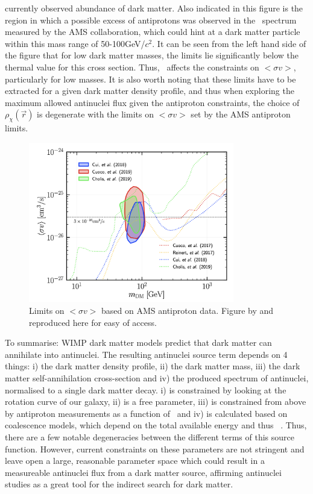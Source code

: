 currently observed abundance of dark matter. Also indicated in this figure is the region in which a possible excess of antiprotons was observed in the \pbar\ spectrum measured by the AMS collaboration, which could hint at a dark matter particle within this mass range of 50-100GeV/$c^2$. It can be seen from the left hand side of the figure that for low dark matter masses, the limits lie significantly below the thermal value for this cross section. Thus, \dmm\ affects the constraints on  $<\sigma v>$, particularly for low masses. It is also worth noting that these limits have to be extracted for a given dark matter density profile, and thus when exploring the maximum allowed antinuclei flux given the antiproton constraints, the choice of $\rho_\chi(\vec{r})$ is degenerate with the limits on $<\sigma v>$ set by the AMS antiproton limits.\\

\begin{figure}[h]
    \centering
    \includegraphics[width=0.8\textwidth]{figures/PbarLimitsAMS.png}
    \caption{Limits on  $<\sigma v>$ based on AMS antiproton data. Figure by \cite{} and reproduced here for easy of access.}
    \label{fig:DMSigmaVLimits}
\end{figure}

To summarise: WIMP dark matter models predict that dark matter can annihilate into antinuclei. The resulting antinuclei source term depends on 4 things: i) the dark matter density profile, ii) the dark matter mass, iii) the dark matter self-annihilation cross-section and iv) the produced spectrum of antinuclei, normalised to a single dark matter decay. i) is constrained by looking at the rotation curve of our galaxy, ii) is a free parameter, iii) is constrained from above by antiproton measurements as a function of \dmm\ and iv) is calculated based on coalescence models, which depend on the total available energy and thus \dmm\ . Thus, there are a few notable degeneracies between the different terms of this source function. However, current constraints on these parameters are not stringent and leave open a large, reasonable parameter space which could result in a measureable antinuclei flux from a dark matter source, affirming antinuclei studies as a great tool for the indirect search for dark matter.



